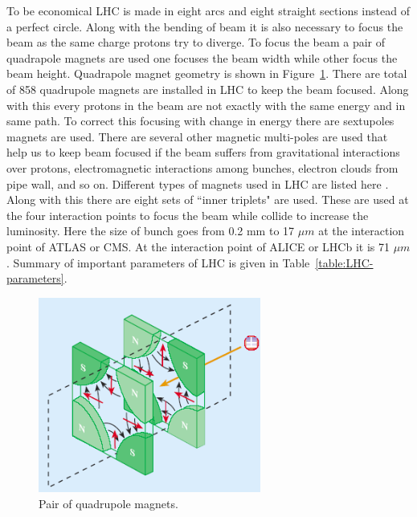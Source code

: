 To be economical LHC is made in eight arcs and eight straight sections instead of a perfect circle. Along with the bending of beam it is also necessary to focus the beam as the same charge protons try to diverge. To focus the beam a pair of quadrapole magnets are used one focuses the beam width while other focus the beam height. Quadrapole magnet geometry is shown in Figure~\ref{fig:QuadrupoleMagnet}. There are total of 858 quadrupole magnets are installed in LHC to keep the beam focused. Along with this every protons in the beam are not exactly with the same energy and in same path. To correct this focusing with change in energy there are sextupoles magnets are used. There are several other magnetic multi-poles are used that help us to keep beam focused if the beam suffers from gravitational interactions over protons, electromagnetic interactions among bunches, electron clouds from pipe wall, and so on. Different types of magnets used in LHC are listed here \cite{WebLink:LHC_magnets}. Along with this there are eight sets of ``inner triplets" are used. These are used at the four interaction points to focus the beam while collide to increase the luminosity. Here the size of bunch goes from 0.2 mm to 17 $\mu m$ at the interaction point of ATLAS or CMS. At the interaction point of ALICE or LHCb it is 71 $\mu m$. Summary of important parameters of LHC is given in Table~\ref{table:LHC-parameters}.
\begin{figure}[!htbp]
	\centering
	\includegraphics[width=0.65\textwidth]{figures/LHC/quadrupole_magnet_pair.png}
	\caption{Pair of quadrupole magnets.}
	\label{fig:QuadrupoleMagnet}
\end{figure}



